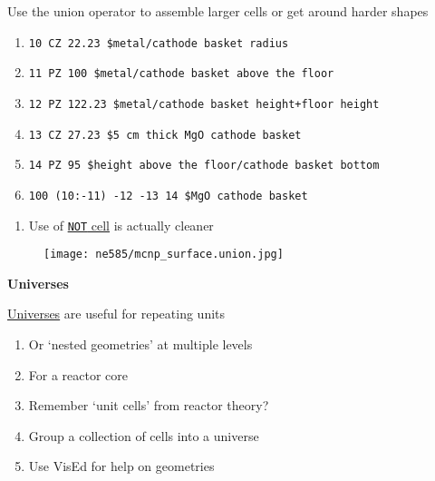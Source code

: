 \documentclass[aspectratio=1610,pdftex,dvipsnames,compress,xcolor={dvipsnames}]{beamer}
\begin{document}
\begin{frame}{Use the union operator to assemble larger cells or get around harder shapes}
    \small
    \begin{enumerate}[series=outerlist,topsep=0pt,itemsep=1pt,leftmargin=*,label=(\arabic*)]
        \item[]\texttt{10     CZ  22.23         \$metal/cathode basket radius}
        \item[]\texttt{11     PZ  100           \$metal/cathode basket above the floor}
        \item[]\texttt{12     PZ  122.23        \$metal/cathode basket height+floor height}
        \item[]\texttt{13     CZ  27.23         \$5 cm thick MgO cathode basket}
        \item[]\texttt{14     PZ  95            \$height above the floor/cathode basket bottom}
            \vspace{0.10in}
        \item[]\texttt{100    (10:-11)  -12 -13 14   \$MgO cathode basket}
    \end{enumerate}
    \normalsize
    \begin{enumerate}[series=outerlist,topsep=19pt,itemsep=21pt,leftmargin=*,label=(\arabic*)]
        \item[]Use of \href{https://github.com/TheDoctorRAB/igem}{\texttt{NOT} cell} is actually cleaner 
    \end{enumerate}
\end{frame}


\begin{frame}{}
    \begin{figure}
        \centering
        \texttt{[image: ne585/mcnp\_surface.union.jpg]}
    \end{figure}
\end{frame}


\begin{frame}[plain]{}
    \centering\LARGE\textbf{Universes}
\end{frame}


\addtocounter{framenumber}{-1} 
\begin{frame}{\href{https://github.com/TheDoctorRAB/igem}{Universes} are useful for repeating units}
    \begin{enumerate}[series=outerlist,topsep=0pt,itemsep=21pt,leftmargin=*,label=(\arabic*)]
        \item[]Or `nested geometries' at multiple levels
        \item[]For a reactor core
        \item[]Remember `unit cells' from reactor theory?
        \item[]Group a collection of cells into a universe
        \item[]Use VisEd for help on geometries
    \end{enumerate}
\end{frame}
\end{document}
